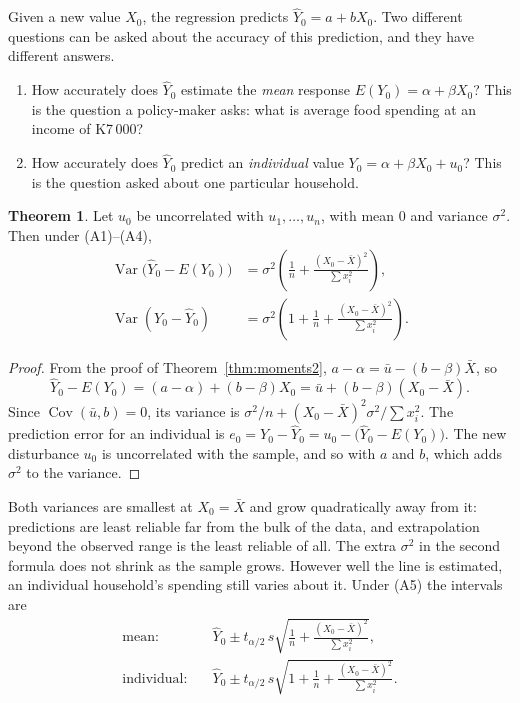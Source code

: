 \documentclass[11pt,a4paper]{article}
\numberwithin{equation}{section}
\DeclareMathOperator{\Var}{Var}
\DeclareMathOperator{\Cov}{Cov}
\theoremstyle{definition}
\newtheorem{thm}{Theorem}[subsection]
\begin{document}
Given a new value $X_0$, the regression predicts $\hat Y_0 = a + bX_0$. Two different questions can be asked about the accuracy of this
prediction, and they have different answers.
\begin{enumerate}[label=(\roman*)]
\item How accurately does $\hat Y_0$ estimate the \emph{mean} response $E(Y_0) = \alpha + \beta X_0$? This is the question a policy-maker asks:
what is average food spending at an income of K7\,000?
\item How accurately does $\hat Y_0$ predict an \emph{individual} value $Y_0 = \alpha + \beta X_0 + u_0$? This is the question asked about one
particular household.
\end{enumerate}

\begin{thm}
\label{thm:pred2}
Let $u_0$ be uncorrelated with $u_1, \dots, u_n$, with mean $0$ and variance $\sigma^2$. Then under (A1)--(A4),
\begin{align*}
\Var\bigl(\hat Y_0 - E(Y_0)\bigr) &= \sigma^2\left(\frac1n + \frac{(X_0 - \bar X)^2}{\sum x_i^2}\right),\\
\Var(Y_0 - \hat Y_0) &= \sigma^2\left(1 + \frac1n + \frac{(X_0 - \bar X)^2}{\sum x_i^2}\right).
\end{align*}
\end{thm}

\begin{proof}
From the proof of Theorem~\ref{thm:moments2}, $a - \alpha = \bar u - (b - \beta)\bar X$, so
\[
\hat Y_0 - E(Y_0) = (a - \alpha) + (b - \beta)X_0 = \bar u + (b - \beta)(X_0 - \bar X) .
\]
Since $\Cov(\bar u, b) = 0$, its variance is $\sigma^2/n + (X_0 - \bar X)^2\sigma^2/\sum x_i^2$. The prediction error for an individual is
$e_0 = Y_0 - \hat Y_0 = u_0 - \bigl(\hat Y_0 - E(Y_0)\bigr)$. The new disturbance $u_0$ is uncorrelated with the sample, and so with $a$ and $b$, which
adds $\sigma^2$ to the variance.
\end{proof}

Both variances are smallest at $X_0 = \bar X$ and grow quadratically away from it: predictions are least reliable far from the bulk of the data,
and extrapolation beyond the observed range is the least reliable of all. The extra $\sigma^2$ in the second formula does not shrink as the sample
grows. However well the line is estimated, an individual household's spending still varies about it. Under (A5) the intervals are
\begin{align*}
\text{mean:}\quad & \hat Y_0 \pm t_{\alpha/2}\, s\sqrt{\frac1n + \frac{(X_0 - \bar X)^2}{\sum x_i^2}} ,\\
\text{individual:}\quad & \hat Y_0 \pm t_{\alpha/2}\, s\sqrt{1 + \frac1n + \frac{(X_0 - \bar X)^2}{\sum x_i^2}} .
\end{align*}
\end{document}
